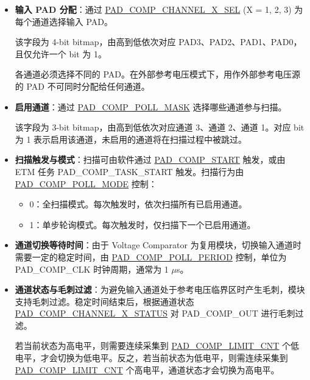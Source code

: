 \documentclass[main\_\_CN.tex]{subfiles}
\begin{document}
\begin{itemize}
    \item \textbf{输入 PAD 分配}：通过 \hyperref[fielddesc:PADCOMPCHANNEL1SEL]{PAD\_COMP\_CHANNEL\_X\_SEL} (X = 1, 2, 3) 为每个通道选择输入 PAD。
    
    该字段为 4-bit bitmap，由高到低依次对应 PAD3、PAD2、PAD1、PAD0，且仅允许一个 bit 为 1。
    
    \begin{tiplisting}
    各通道必须选择不同的 PAD。在外部参考电压模式下，用作外部参考电压源的 PAD 不可同时分配给任何通道。
    \end{tiplisting}

    \item \textbf{启用通道}：通过 \hyperref[fielddesc:PADCOMPPOLLMASK]{PAD\_COMP\_POLL\_MASK} 选择哪些通道参与扫描。
    
    该字段为 3-bit bitmap，由高到低依次对应通道 3、通道 2、通道 1。对应 bit 为 1 表示启用该通道，未启用的通道将在扫描过程中被跳过。

    \item \textbf{扫描触发与模式}：扫描可由软件通过 \hyperref[fielddesc:PADCOMPSTART]{PAD\_COMP\_START} 触发，或由 ETM 任务 PAD\_COMP\_TASK\_START 触发。扫描行为由 \hyperref[fielddesc:PADCOMPPOLLMODE]{PAD\_COMP\_POLL\_MODE} 控制：
      \begin{itemize}
        \item 0：全扫描模式。每次触发时，依次扫描所有已启用通道。
        \item 1：单步轮询模式。每次触发时，仅扫描下一个已启用通道。
      \end{itemize}
            

    \item \textbf{通道切换等待时间}：由于 Voltage Comparator 为复用模块，切换输入通道时需要一定的稳定时间，由 \hyperref[fielddesc:PADCOMPPOLLPERIOD]{PAD\_COMP\_POLL\_PERIOD} 控制，单位为 PAD\_COMP\_CLK 时钟周期，通常为 1 $\mu$s。
            
    \item \textbf{通道状态与毛刺过滤}：为避免输入通道处于参考电压临界区时产生毛刺，模块支持毛刺过滤。稳定时间结束后，根据通道状态 \hyperref[fielddesc:PADCOMPCHANNEL1STATUS]{PAD\_COMP\_CHANNEL\_X\_STATUS} 对 PAD\_COMP\_OUT 进行毛刺过滤。

    若当前状态为高电平，则需要连续采集到 \hyperref[fielddesc:PADCOMPLIMITCNT]{PAD\_COMP\_LIMIT\_CNT} 个低电平，才会切换为低电平。反之，若当前状态为低电平，则需连续采集到 \hyperref[fielddesc:PADCOMPLIMITCNT]{PAD\_COMP\_LIMIT\_CNT} 个高电平，通道状态才会切换为高电平。


\end{itemize}
\end{document}
